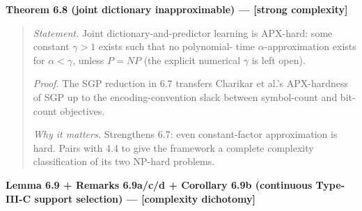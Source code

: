 \documentclass[
]{article}
\begin{document}
\textbf{Theorem 6.8 (joint dictionary inapproximable) --- {[}strong
complexity{]}}

\begin{quote}
\emph{Statement.} Joint dictionary-and-predictor learning is
APX-hard: some constant $\gamma > 1$ exists such that no polynomial-
time $\alpha$-approximation exists for $\alpha < \gamma$, unless
$P = NP$ (the explicit numerical $\gamma$ is left open).

\emph{Proof.} The SGP reduction in 6.7 transfers Charikar et al.'s
APX-hardness of SGP up to the encoding-convention slack between
symbol-count and bit-count objectives.

\emph{Why it matters.} Strengthens 6.7: even constant-factor
approximation is hard. Pairs with 4.4 to give the framework a complete
complexity classification of its two NP-hard problems.
\end{quote}

\textbf{Lemma 6.9 + Remarks 6.9a/c/d + Corollary 6.9b (continuous
Type-III-C support selection) --- {[}complexity dichotomy{]}}
\end{document}
